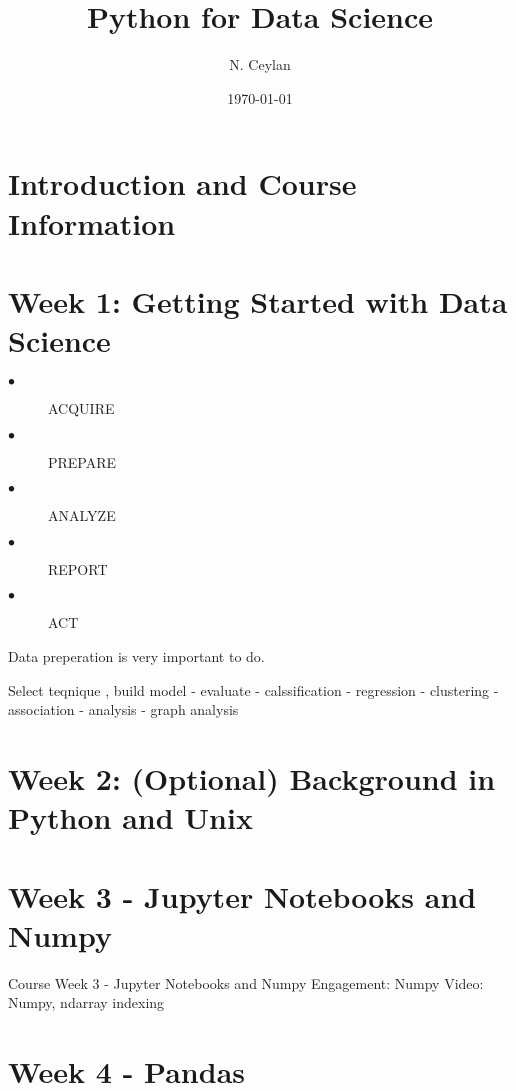 \documentclass[letterpaper,12pt]{article}
\begin{document}
\title{Python for Data Science}
\author{N. Ceylan}
\date{\today}
\maketitle


\section{Introduction and Course Information}

\section{Week 1: Getting Started with Data Science}


\begin{description}
	\item[$\bullet$] ACQUIRE
	\item[$\bullet$] PREPARE
		\item[$\bullet$] ANALYZE
			\item[$\bullet$] REPORT
				\item[$\bullet$] ACT
    
    
\end{description}

Data preperation is very important to do.

Select teqnique , build model - evaluate - calssification - regression - clustering - association - analysis - graph analysis

\section{Week 2: (Optional) Background in Python and Unix}







\section{Week 3 - Jupyter Notebooks and Numpy}

Course   Week 3 - Jupyter Notebooks and Numpy   Engagement: Numpy   Video: Numpy, ndarray indexing



\section{Week 4 - Pandas}
\end{document}
